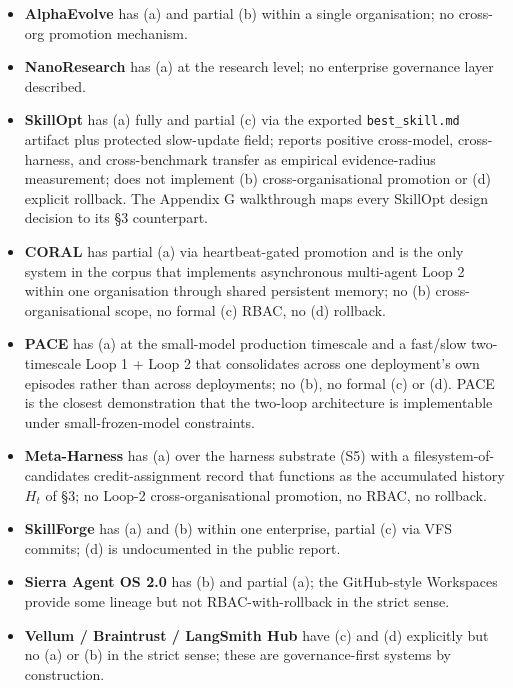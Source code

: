 \begin{itemize}
\tightlist
\item
  \textbf{AlphaEvolve} has (a) and partial (b) within a single
  organisation; no cross-org promotion mechanism.
\item
  \textbf{NanoResearch} has (a) at the research level; no enterprise
  governance layer described.
\item
  \textbf{SkillOpt} has (a) fully and partial (c) via the exported
  \texttt{best\_skill.md} artifact plus protected slow-update field;
  reports positive cross-model, cross-harness, and cross-benchmark
  transfer as empirical evidence-radius measurement; does not implement
  (b) cross-organisational promotion or (d) explicit rollback. The
  Appendix G walkthrough maps every SkillOpt design decision to its §3
  counterpart.
\item
  \textbf{CORAL} \citep{qu2026coral} has partial (a) via heartbeat-gated
  promotion and is the only system in the corpus that implements
  asynchronous multi-agent Loop 2 within one organisation through shared
  persistent memory; no (b) cross-organisational scope, no formal (c)
  RBAC, no (d) rollback.
\item
  \textbf{PACE} \citep{ling2026pace} has (a) at the small-model
  production timescale and a fast/slow two-timescale Loop 1 + Loop 2
  that consolidates across one deployment's own episodes rather than
  across deployments; no (b), no formal (c) or (d). PACE is the closest
  demonstration that the two-loop architecture is implementable under
  small-frozen-model constraints.
\item
  \textbf{Meta-Harness} \citep{lee2026metaharness} has (a) over the
  harness substrate (S5) with a filesystem-of-candidates
  credit-assignment record that functions as the accumulated history
  \(H_t\) of §3; no Loop-2 cross-organisational promotion, no RBAC, no
  rollback.
\item
  \textbf{SkillForge} has (a) and (b) within one enterprise, partial (c)
  via VFS commits; (d) is undocumented in the public report.
\item
  \textbf{Sierra Agent OS 2.0} has (b) and partial (a); the GitHub-style
  Workspaces provide some lineage but not RBAC-with-rollback in the
  strict sense.
\item
  \textbf{Vellum / Braintrust / LangSmith Hub} have (c) and (d)
  explicitly but no (a) or (b) in the strict sense; these are
  governance-first systems by construction.
\end{itemize}

